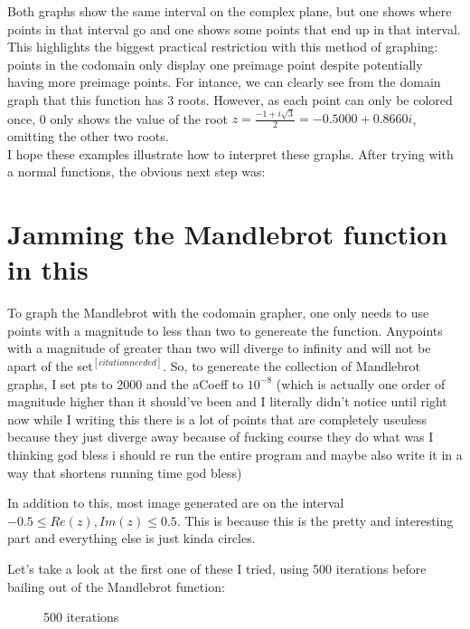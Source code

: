 \documentclass[letterpaper,12pt]{article}
\begin{document}
Both graphs show the same interval on the complex plane, but one shows where points in that interval go and one shows some points that end up in that interval.
This highlights the biggest practical restriction with this method of graphing: points in the codomain only display one preimage point despite potentially having more preimage points.
For intance, we can clearly see from the domain graph that this function has 3 roots.
However, as each point can only be colored once, 0 only shows the value of the root $z= \frac{-1 + i\sqrt{3}}{2} = -0.5000 + 0.8660i$, omitting the other two roots. \\

I hope these examples illustrate how to interpret these graphs.
After trying with a normal functions, the obvious next step was:

\section{Jamming the Mandlebrot function in this}

To graph the Mandlebrot with the codomain grapher, one only needs to use points with a magnitude to less than two to genereate the function.
Anypoints with a magnitude of greater than two will diverge to infinity and will not be apart of the set$^{[citation needed]}$.
So, to genereate the collection of Mandlebrot graphs, I set pts to 2000 and the aCoeff to $10^{-8}$ (which is actually one order of magnitude higher than it should've been and I literally didn't notice until right now while I writing this there is a lot of points that are completely useuless because they just diverge away because of fucking course they do what was I thinking god bless i should re run the entire program and maybe also write it in a way that shortens running time god bless)

In addition to this, most image generated are on the interval $ -0.5 \leq Re(z), Im(z) \leq 0.5$.
This is because this is the pretty and interesting part and everything else is just kinda circles.

Let's take a look at the first one of these I tried, using 500 iterations before bailing out of the Mandlebrot function:

\begin{figure}[h]
	\noindent{}
	\centering
	\caption{500 iterations}
	\centering
\end{figure}
\end{document}
